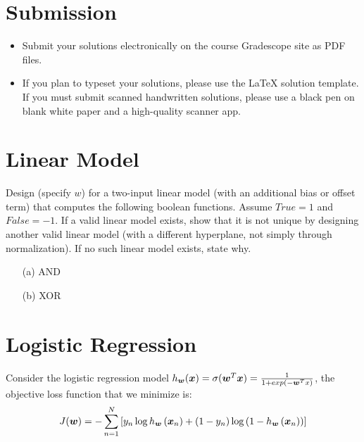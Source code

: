\documentclass[11pt]{article}
\begin{document}
\author{}
\date{}
\maketitle
\vspace{-0.75in}

\vspace{-11pt}
 

\ifsoln
\else
\section*{Submission}
\begin{itemize}
\item 
Submit your solutions electronically on the course Gradescope site as PDF files.
\item If you plan to typeset your solutions, please use the LaTeX solution template. If you must submit scanned handwritten solutions, please use a black pen on blank white paper and a high-quality scanner app.
\end{itemize}
\fi

\ifnotsolution{\newpage}
\section{Linear Model }
Design (specify $w$) for a two-input linear model (with an additional bias or offset term) that computes the following boolean functions. Assume $True=1$ and $False=-1$. If a valid linear model exists, show that it is not unique by designing another valid linear model (with a different hyperplane, not simply through normalization). If no such linear model exists, state why.
\begin{itemize}
	\item [(a)] AND 
	\item [(b)] XOR 
\end{itemize}
\solution{}

\section{Logistic Regression }

Consider the logistic regression model $h_{\boldsymbol{w}}(\boldsymbol{x}) = \sigma(\boldsymbol{w}^T \boldsymbol{x})=\frac{1}{1+ exp(-\boldsymbol{w}^Tx)}$, the objective loss function that we minimize is:
\begin{equation*}
J(\boldsymbol{w}) = 
  - \sum_{n=1}^{N}{
  \left[ y_{n} \log h_{\boldsymbol{w}}\left(\boldsymbol{x}_{n}\right) 
  + \left(1 - y_{n}\right) \log \left(1 - h_{\boldsymbol{w}}\left(\boldsymbol{x}_{n}\right)\right) \right]}
\end{equation*}
\end{document}
